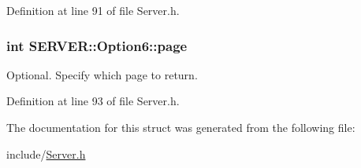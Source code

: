 Definition at line 91 of file Server.h.\hypertarget{structSERVER_1_1Option6_2ded4c2cbd9fa82ef1f27cb98c6849ac}{
\subsubsection{\setlength{\rightskip}{0pt plus 5cm}int {\bf SERVER::Option6::page}}}
\label{structSERVER_1_1Option6_2ded4c2cbd9fa82ef1f27cb98c6849ac}


Optional. Specify which page to return. 



Definition at line 93 of file Server.h.

The documentation for this struct was generated from the following file:\begin{CompactItemize}
\item 
include/\hyperlink{Server_8h}{Server.h}\end{CompactItemize}
